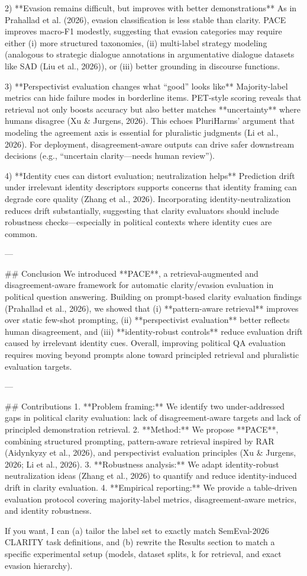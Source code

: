 2) **Evasion remains difficult, but improves with better demonstrations**  
As in Prahallad et al. (2026), evasion classification is less stable than clarity. PACE improves macro-F1 modestly, suggesting that evasion categories may require either (i) more structured taxonomies, (ii) multi-label strategy modeling (analogous to strategic dialogue annotations in argumentative dialogue datasets like SAD (Liu et al., 2026)), or (iii) better grounding in discourse functions.

3) **Perspectivist evaluation changes what “good” looks like**  
Majority-label metrics can hide failure modes in borderline items. PET-style scoring reveals that retrieval not only boosts accuracy but also better matches **uncertainty** where humans disagree (Xu & Jurgens, 2026). This echoes PluriHarms’ argument that modeling the agreement axis is essential for pluralistic judgments (Li et al., 2026). For deployment, disagreement-aware outputs can drive safer downstream decisions (e.g., “uncertain clarity—needs human review”).

4) **Identity cues can distort evaluation; neutralization helps**  
Prediction drift under irrelevant identity descriptors supports concerns that identity framing can degrade core quality (Zhang et al., 2026). Incorporating identity-neutralization reduces drift substantially, suggesting that clarity evaluators should include robustness checks—especially in political contexts where identity cues are common.

---

## Conclusion  
We introduced **PACE**, a retrieval-augmented and disagreement-aware framework for automatic clarity/evasion evaluation in political question answering. Building on prompt-based clarity evaluation findings (Prahallad et al., 2026), we showed that (i) **pattern-aware retrieval** improves over static few-shot prompting, (ii) **perspectivist evaluation** better reflects human disagreement, and (iii) **identity-robust controls** reduce evaluation drift caused by irrelevant identity cues. Overall, improving political QA evaluation requires moving beyond prompts alone toward principled retrieval and pluralistic evaluation targets.

---

## Contributions  
1. **Problem framing:** We identify two under-addressed gaps in political clarity evaluation: lack of disagreement-aware targets and lack of principled demonstration retrieval.  
2. **Method:** We propose **PACE**, combining structured prompting, pattern-aware retrieval inspired by RAR (Aidynkyzy et al., 2026), and perspectivist evaluation principles (Xu & Jurgens, 2026; Li et al., 2026).  
3. **Robustness analysis:** We adapt identity-robust neutralization ideas (Zhang et al., 2026) to quantify and reduce identity-induced drift in clarity evaluation.  
4. **Empirical reporting:** We provide a table-driven evaluation protocol covering majority-label metrics, disagreement-aware metrics, and identity robustness.

If you want, I can (a) tailor the label set to exactly match SemEval-2026 CLARITY task definitions, and (b) rewrite the Results section to match a specific experimental setup (models, dataset splits, k for retrieval, and exact evasion hierarchy).